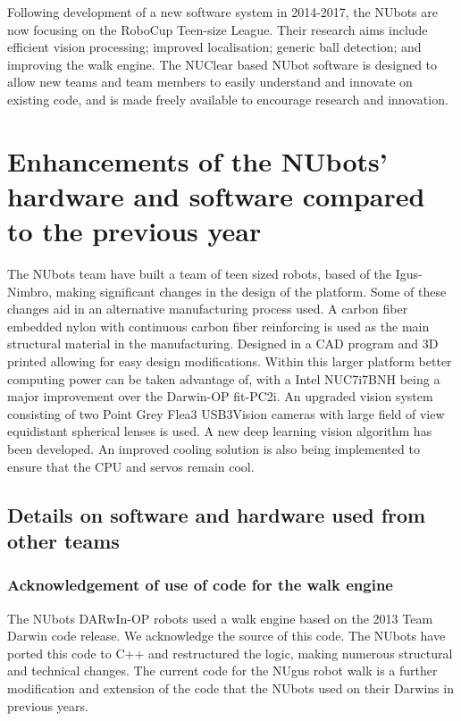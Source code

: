 \documentclass{llncs}
\begin{document}
Following development of a new software system in 2014-2017, the NUbots are now focusing on the RoboCup Teen-size League. Their research aims include efficient vision processing; improved localisation; generic ball detection; and improving the walk engine. The NUClear based NUbot software is designed to allow new teams and team members to easily understand and innovate on existing code, and is made freely available to encourage research and innovation.


\section{Enhancements of the NUbots’ hardware and software compared to the previous year}
The NUbots team have built a team of teen sized robots, based of the Igus-Nimbro, making significant changes in the design of the platform. Some of these changes aid in an alternative manufacturing process used. A carbon fiber embedded nylon with continuous carbon fiber reinforcing is used as the main structural material in the manufacturing. Designed in a CAD program and 3D printed allowing for easy design modifications. Within this larger platform better computing power can be taken advantage of, with a Intel NUC7i7BNH being a major improvement over the Darwin-OP fit-PC2i. An upgraded vision system consisting of two Point Grey Flea3 USB3Vision cameras with large field of view equidistant spherical lenses is used. A new deep learning vision algorithm has been developed. An improved cooling solution is also being implemented to ensure that the CPU and servos remain cool.

\subsection{Details on software and hardware used from other teams}

\subsubsection{Acknowledgement of use of code for the walk engine}
The NUbots DARwIn-OP robots used a walk engine based on the 2013 Team Darwin code release. We acknowledge the source of this code. The NUbots have ported this code to C++ and restructured the logic, making numerous structural and technical changes. The current code for the NUgus robot walk is a further modification and extension of the code  that the NUbots used on their Darwins in previous years.
\end{document}
